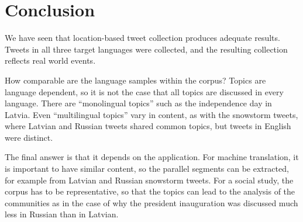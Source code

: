 \documentclass[11pt,a4paper]{article}
\begin{document}
\section{Conclusion}

We have seen that location-based tweet collection produces adequate results. Tweets in all three target languages were collected, and the resulting collection reflects real world events.

How comparable are the language samples within the corpus? Topics are language dependent, so it is not the case that all topics are discussed in every language. There are ``monolingual topics'' such as the independence day in Latvia. Even ``multilingual topics'' vary in content, as with the snowstorm tweets, where Latvian and Russian tweets shared common topics, but tweets in English were distinct.

%
The final answer is that it depends on the application. For machine translation, it is important to have similar content, so the parallel segments can be extracted, for example from Latvian and Russian snowstorm tweets. For a social study, the corpus has to be representative, so that the topics can lead to the analysis of the communities as in the case of why the president inauguration was discussed much less in Russian than in Latvian.



\balance



\end{document}

